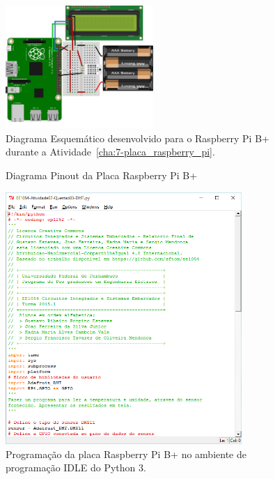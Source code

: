 \documentclass[
	12pt,				%
	openright,			%
  oneside,     %
	a4paper,			%
	english,			%
	french,				%
	spanish,			%
	brazil				%
	]{abntex2}
\begin{document}
\begin{figure}[!ht]
  \centering
  \caption{\label{fig:05Schematic}Diagrama Esquemático desenvolvido para o Raspberry Pi B+ durante a Atividade~\ref{cha:7-placa_raspberry_pi}.}
  \includegraphics[width=0.5\textwidth]{images/Atividade07/05Schematic.jpg}
\end{figure}

\newpage

\begin{figure}[H]
  \centering
  \caption{\label{fig:cha-7-diagrama-pinout}Diagrama Pinout da Placa Raspberry Pi B+}
  
\end{figure}

\newpage

\begin{figure}[ht]
  \centering
  \caption{\label{fig:cha-7-idle}Programação da placa Raspberry Pi B+ no ambiente de programação IDLE do Python 3.}
  \includegraphics[width=0.8\textwidth]{images/Atividade07/IDLE.png}
\end{figure}
\end{document}
